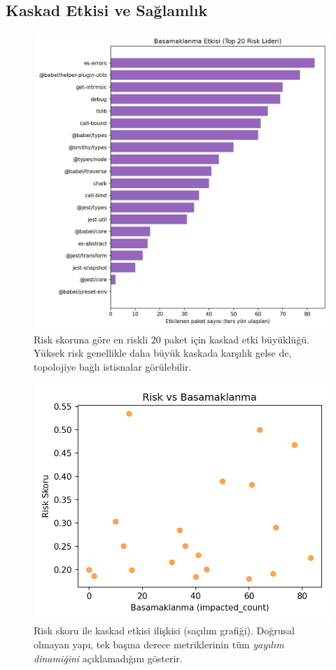 \documentclass[11pt,a4paper]{article}
\begin{document}
\subsection{Kaskad Etkisi ve Sağlamlık}
\begin{figure}[H]
  \centering
  \includegraphics{cascade_impact_top20.png}
  \caption{Risk skoruna göre en riskli 20 paket için kaskad etki büyüklüğü. Yüksek risk genellikle daha büyük kaskada karşılık gelse de, topolojiye bağlı istisnalar görülebilir.}
\end{figure}

\begin{figure}[H]
  \centering
  \includegraphics{risk_vs_cascade.png}
  \caption{Risk skoru ile kaskad etkisi ilişkisi (saçılım grafiği). Doğrusal olmayan yapı, tek başına derece metriklerinin tüm \emph{yayılım dinamiğini} açıklamadığını gösterir.}
\end{figure}
\end{document}
